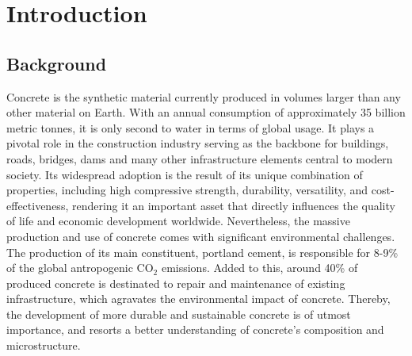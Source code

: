 
\chapter{Introduction} %

\label{Chapter1} %



\section{Background}
Concrete is the synthetic material currently produced in volumes larger than any other material on Earth. With an annual consumption of approximately 35 billion metric tonnes, it is only second to water in terms of global usage\supercite{mehta2014concrete, Monteiro2017}. It plays a pivotal role in the construction industry serving as the backbone for buildings, roads, bridges, dams and many other infrastructure elements central to modern society. Its widespread adoption is the result of its unique combination of properties, including high compressive strength, durability, versatility, and cost-effectiveness\supercite{mehta2014concrete}, rendering it an important asset that directly influences the quality of life and economic development worldwide\supercite{VanDamme2018,Biernacki2017}. Nevertheless, the massive production and use of concrete comes with significant environmental challenges. The production of its main constituent, portland cement, is responsible for 8-9\% of the global antropogenic CO$_2$ emissions\supercite{Monteiro2017}. Added to this, around 40\% of produced concrete is destinated to repair and maintenance of existing infrastructure\supercite{mehta2014concrete}, which agravates the environmental impact of concrete. Thereby, the development of more durable and sustainable concrete is of utmost importance, and resorts a better understanding of concrete's composition and microstructure. 

